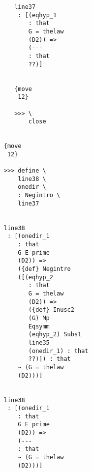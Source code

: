 \documentclass[12pt]{article}
\begin{document}
\begin{verbatim}
                                       line37 
                                        : [(eqhyp_1 
                                           : that 
                                           G = thelaw 
                                           (D2)) => 
                                           (--- 
                                           : that 
                                           ??)]


                                       {move 
                                        12}

                                       >>> \
                                           close


                                    {move 
                                     12}

                                    >>> define \
                                        line38 \
                                        onedir \
                                        : Negintro \
                                        line37


                                    line38 
                                     : [(onedir_1 
                                        : that 
                                        G E prime 
                                        (D2)) => 
                                        ({def} Negintro 
                                        ([(eqhyp_2 
                                           : that 
                                           G = thelaw 
                                           (D2)) => 
                                           ({def} Inusc2 
                                           (G) Mp 
                                           Eqsymm 
                                           (eqhyp_2) Subs1 
                                           line35 
                                           (onedir_1) : that 
                                           ??)]) : that 
                                        ~ (G = thelaw 
                                        (D2)))]


                                    line38 
                                     : [(onedir_1 
                                        : that 
                                        G E prime 
                                        (D2)) => 
                                        (--- 
                                        : that 
                                        ~ (G = thelaw 
                                        (D2)))]



\end{verbatim}
\end{document}
